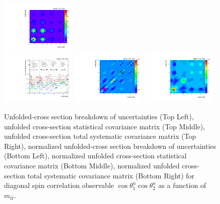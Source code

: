 \begin{refsection}
\begin{figure}[htb]
\begin{center}
 \includegraphics[width=0.32\textwidth]{fig_fullRun2UL/unfolding/combined/TotalSystCovMatrix_rebinnedB_c_nn_mttbar.pdf} \\
 \includegraphics[width=0.32\textwidth]{fig_fullRun2UL/unfolding/combined/deltaSystCombinedlogNorm_rebinnedB_c_nn_mttbar.pdf}
 \includegraphics[width=0.32\textwidth]{fig_fullRun2UL/unfolding/combined/StatCovMatrixNorm_rebinnedB_c_nn_mttbar.pdf}
 \includegraphics[width=0.32\textwidth]{fig_fullRun2UL/unfolding/combined/TotalSystCovMatrixNorm_rebinnedB_c_nn_mttbar.pdf} \\
\caption{Unfolded-cross section breakdown of uncertainties (Top Left), unfolded cross-section statistical covariance matrix (Top Middle), unfolded cross-section total systematic covariance matrix (Top Right), normalized unfolded-cross section breakdown of uncertainties (Bottom Left), normalized unfolded cross-section statistical covariance matrix (Bottom Middle), normalized unfolded cross-section total systematic covariance matrix (Bottom Right) for diagonal spin correlation observable $\cos\theta_{1}^{n}\cos\theta_{2}^{n}$ as a function of $m_{t\bar{t}}$.}
\label{fig:c_nn_mttbar_uncertainties}
\end{center}
\end{figure}

\end{refsection}
